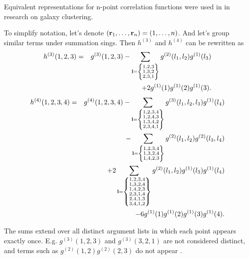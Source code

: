 Equivalent representations for n-point correlation functions were used in \cite{white1979} in research on galaxy clustering.

To simplify notation, let's denote $(\vb{r}_1, \dotsc, \vb{r}_n) = (1, \dotsc, n)$. And let's group similar terms under summation sings.
Then $h^{(3)}$ and $h^{(4)}$ can be rewritten as
\begin{eqnarray}
h^{(3)}(1,2,3) &=& g^{(3)}(1, 2, 3) 
- \sum_{\vb l = \left\{\substack{1,2,3 \\ 1,3,2 \\ 2,3,1} \right\} } g^{(2)}(l_1,l_2) g^{(1)}(l_3)
\nonumber\\
&& +2g^{(1)}(1)g^{(1)}(2)g^{(1)}(3).
\end{eqnarray}
\begin{eqnarray}
h^{(4)}(1,2,3,4) &=& g^{(4)}(1,2,3,4) 
- \sum_{\vb l = \left\{\substack{1,2,3,4 \\ 1,2,4,3 \\ 1,3,4,2 \\ 2,3,4,1}\right\} }g^{(3)}(l_1,l_2,l_3) g^{(1)}(l_4) 
\nonumber\\
&&-\sum_{\vb l = \left\{ \substack{1,2,3,4 \\ 1,3,2,4 \\ 1,4,2,3} \right\}}g^{(2)}(l_1,l_2) g^{(2)}(l_3,l_4)
\nonumber\\
&& + 2\sum_{\vb l = \left\{\substack{1,2,3,4 \\ 1,3,2,4 \\ 1,4,2,3 \\ 2,3,1,4 \\ 2,4,1,3 \\ 3,4,1,2} \right\}} g^{(2)}(l_1,l_2)g^{(1)}(l_3) g^{(1)}(l_4) 
\nonumber\\
&&-6g^{(1)}(1) g^{(1)}(2)g^{(1)}(3) g^{(1)}(4).
\end{eqnarray}

The sums extend over all distinct argument lists in which each point appears exactly once. E.g. $g^{(3)}(1,2,3)$ and $g^{(3)}(3,2,1)$ are not considered distinct, and terms such as $g^{(2)}(1,2)g^{(2)}(2,3)$ do not appear \cite{white1979}.

